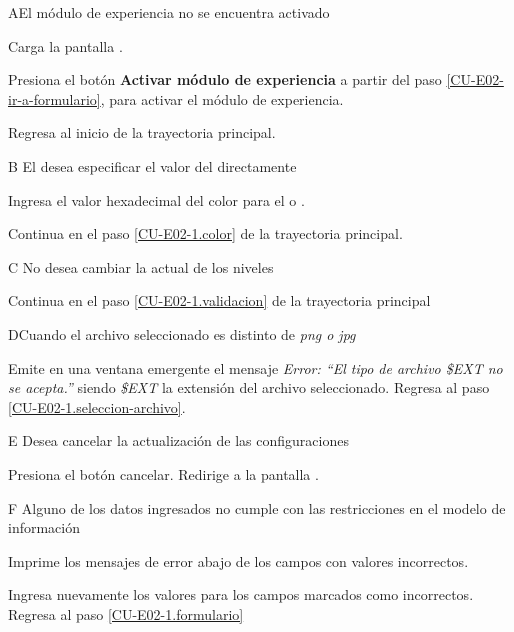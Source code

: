 \begin{UCtrayectoriaA}{A}{El módulo de experiencia no se encuentra activado}

  \Sistema Carga la pantalla .

  \Actor Presiona el botón {\bf Activar módulo de experiencia}
   a partir del paso \ref{CU-E02-ir-a-formulario},
                     para activar el módulo de experiencia.

  \Sistema Regresa al inicio de la trayectoria principal.

\end{UCtrayectoriaA}

\begin{UCtrayectoriaA}{B}{%
El  desea especificar el valor del 
directamente}

    \Actor Ingresa el valor hexadecimal del color para el
            o
           .

    \Sistema Continua en el paso \ref{CU-E02-1.color} de la trayectoria principal.

\end{UCtrayectoriaA}

\begin{UCtrayectoriaA}{C}{%
No desea cambiar la  actual de los niveles}

    \Sistema Continua en el paso \ref{CU-E02-1.validacion} de la trayectoria principal
\end{UCtrayectoriaA}

\begin{UCtrayectoriaA}{D}{Cuando el archivo seleccionado es distinto de {\it png o jpg}}

  \Sistema Emite en una ventana emergente el mensaje {\it Error: ``El tipo de
           archivo \$EXT no se acepta.''} siendo {\it\$EXT} la extensión del
           archivo seleccionado.
  \Sistema Regresa al paso \ref{CU-E02-1.seleccion-archivo}.

\end{UCtrayectoriaA}

\begin{UCtrayectoriaA}{E}{%
Desea cancelar la actualización de las configuraciones}

  \Actor Presiona el botón cancelar.
  \Sistema Redirige a la pantalla .

\end{UCtrayectoriaA}

\begin{UCtrayectoriaA}{F}{%
Alguno de los datos ingresados no cumple con las restricciones en el modelo de
información}

    \Sistema Imprime los mensajes de error abajo de los campos con valores incorrectos.

    \Actor Ingresa nuevamente los valores para los campos marcados como incorrectos.
    \Sistema Regresa al paso \ref{CU-E02-1.formulario}

\end{UCtrayectoriaA}
